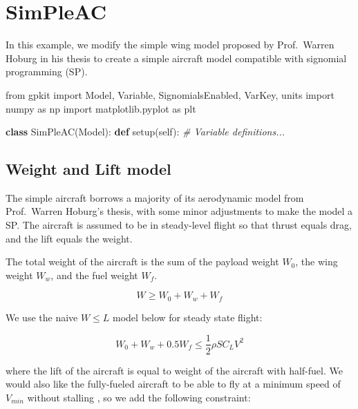 \documentclass[]{article}
\date{}
\newenvironment{Shaded}{}{}
\newcommand{\KeywordTok}[1]{\textcolor[rgb]{0.00,0.44,0.13}{\textbf{#1}}}
\newcommand{\ImportTok}[1]{#1}
\newcommand{\CommentTok}[1]{\textcolor[rgb]{0.38,0.63,0.69}{\textit{#1}}}
\newcommand{\VariableTok}[1]{\textcolor[rgb]{0.10,0.09,0.49}{#1}}
\newcommand{\NormalTok}[1]{#1}
\begin{document}
\section{SimPleAC}\label{simpleac}

In this example, we modify the simple wing model proposed by
Prof.~Warren Hoburg in his thesis to create a simple aircraft model
compatible with signomial programming (SP).

\begin{Shaded}
\begin{Highlighting}[]
\ImportTok{from}\NormalTok{ gpkit }\ImportTok{import}\NormalTok{ Model, Variable, SignomialsEnabled, VarKey, units}
\ImportTok{import}\NormalTok{ numpy }\ImportTok{as}\NormalTok{ np}
\ImportTok{import}\NormalTok{ matplotlib.pyplot }\ImportTok{as}\NormalTok{ plt}

\KeywordTok{class}\NormalTok{ SimPleAC(Model):}
    \KeywordTok{def}\NormalTok{ setup(}\VariableTok{self}\NormalTok{):}
        \CommentTok{# Variable definitions...}
\end{Highlighting}
\end{Shaded}

\subsection{Weight and Lift model}\label{weight-and-lift-model}

The simple aircraft borrows a majority of its aerodynamic model from
Prof.~Warren Hoburg's thesis, with some minor adjustments to make the
model a SP. The aircraft is assumed to be in steady-level flight so that
thrust equals drag, and the lift equals the weight.

The total weight of the aircraft is the sum of the payload weight
\(W_0\), the wing weight \(W_w\), and the fuel weight \(W_f\).

\begin{equation}
    W \geq W_0 + W_w + W_f
\end{equation}

We use the naive \(W \leq L\) model below for steady state flight:

\begin{equation}
    W_0 + W_w + 0.5 W_f \leq \frac{1}{2} \rho S C_L V^2
\end{equation}

where the lift of the aircraft is equal to weight of the aircraft with
half-fuel. We would also like the fully-fueled aircraft to be able to
fly at a minimum speed of \(V_{min}\) without stalling , so we add the
following constraint:
\end{document}

